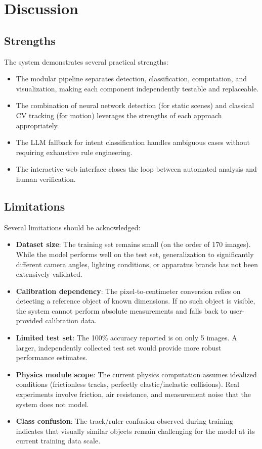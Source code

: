 \documentclass[12pt]{article}
\begin{document}
\section{Discussion}

\subsection{Strengths}

The system demonstrates several practical strengths:
\begin{itemize}[noitemsep]
  \item The modular pipeline separates detection, classification, computation, and visualization, making each component independently testable and replaceable.
  \item The combination of neural network detection (for static scenes) and classical CV tracking (for motion) leverages the strengths of each approach appropriately.
  \item The LLM fallback for intent classification handles ambiguous cases without requiring exhaustive rule engineering.
  \item The interactive web interface closes the loop between automated analysis and human verification.
\end{itemize}

\subsection{Limitations}

Several limitations should be acknowledged:
\begin{itemize}[noitemsep]
  \item \textbf{Dataset size}: The training set remains small (on the order of 170 images). While the model performs well on the test set, generalization to significantly different camera angles, lighting conditions, or apparatus brands has not been extensively validated.
  \item \textbf{Calibration dependency}: The pixel-to-centimeter conversion relies on detecting a reference object of known dimensions. If no such object is visible, the system cannot perform absolute measurements and falls back to user-provided calibration data.
  \item \textbf{Limited test set}: The 100\% accuracy reported is on only 5 images. A larger, independently collected test set would provide more robust performance estimates.
  \item \textbf{Physics module scope}: The current physics computation assumes idealized conditions (frictionless tracks, perfectly elastic/inelastic collisions). Real experiments involve friction, air resistance, and measurement noise that the system does not model.
  \item \textbf{Class confusion}: The track/ruler confusion observed during training indicates that visually similar objects remain challenging for the model at its current training data scale.
\end{itemize}
\end{document}
